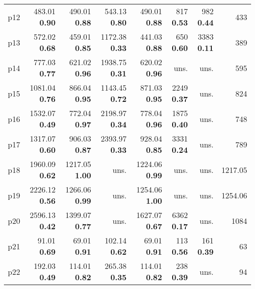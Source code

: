 \begin{tabular}{|l|rrrrrr|r|}
p12 & {\footnotesize 483.01} \textbf{0.90} & {\footnotesize 490.01} \textbf{0.88} & {\footnotesize 543.13} \textbf{0.80} & {\footnotesize 490.01} \textbf{0.88} & {\footnotesize 817} \textbf{0.53} & {\footnotesize 982} \textbf{0.44} & 433\\
p13 & {\footnotesize 572.02} \textbf{0.68} & {\footnotesize 459.01} \textbf{0.85} & {\footnotesize 1172.38} \textbf{0.33} & {\footnotesize 441.03} \textbf{0.88} & {\footnotesize 650} \textbf{0.60} & {\footnotesize 3383} \textbf{0.11} & 389\\
p14 & {\footnotesize 777.03} \textbf{0.77} & {\footnotesize 621.02} \textbf{0.96} & {\footnotesize 1938.75} \textbf{0.31} & {\footnotesize 620.02} \textbf{0.96} & uns. & uns. & 595\\
p15 & {\footnotesize 1081.04} \textbf{0.76} & {\footnotesize 866.04} \textbf{0.95} & {\footnotesize 1143.45} \textbf{0.72} & {\footnotesize 871.03} \textbf{0.95} & {\footnotesize 2249} \textbf{0.37} & uns. & 824\\
p16 & {\footnotesize 1532.07} \textbf{0.49} & {\footnotesize 772.04} \textbf{0.97} & {\footnotesize 2198.97} \textbf{0.34} & {\footnotesize 778.04} \textbf{0.96} & {\footnotesize 1875} \textbf{0.40} & uns. & 748\\
p17 & {\footnotesize 1317.07} \textbf{0.60} & {\footnotesize 906.03} \textbf{0.87} & {\footnotesize 2393.97} \textbf{0.33} & {\footnotesize 928.04} \textbf{0.85} & {\footnotesize 3331} \textbf{0.24} & uns. & 789\\
p18 & {\footnotesize 1960.09} \textbf{0.62} & {\footnotesize 1217.05} \textbf{1.00} & uns. & {\footnotesize 1224.06} \textbf{0.99} & uns. & uns. & 1217.05\\
p19 & {\footnotesize 2226.12} \textbf{0.56} & {\footnotesize 1266.06} \textbf{0.99} & uns. & {\footnotesize 1254.06} \textbf{1.00} & uns. & uns. & 1254.06\\
p20 & {\footnotesize 2596.13} \textbf{0.42} & {\footnotesize 1399.07} \textbf{0.77} & uns. & {\footnotesize 1627.07} \textbf{0.67} & {\footnotesize 6362} \textbf{0.17} & uns. & 1084\\
p21 & {\footnotesize 91.01} \textbf{0.69} & {\footnotesize 69.01} \textbf{0.91} & {\footnotesize 102.14} \textbf{0.62} & {\footnotesize 69.01} \textbf{0.91} & {\footnotesize 113} \textbf{0.56} & {\footnotesize 161} \textbf{0.39} & 63\\
p22 & {\footnotesize 192.03} \textbf{0.49} & {\footnotesize 114.01} \textbf{0.82} & {\footnotesize 265.38} \textbf{0.35} & {\footnotesize 114.01} \textbf{0.82} & {\footnotesize 238} \textbf{0.39} & uns. & 94\\

\end{tabular}
